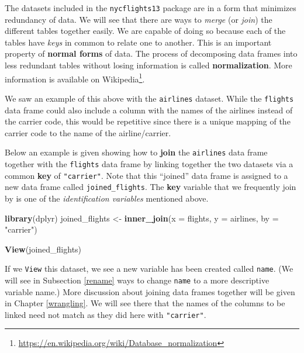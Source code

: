 \documentclass[12pt,]{krantz}
\makeatletter
\newenvironment{Shaded}{\begin{snugshade}}{\end{snugshade}}
\newcommand{\KeywordTok}[1]{\textcolor[rgb]{0.27,0.27,0.27}{\textbf{#1}}}
\newcommand{\DataTypeTok}[1]{\textcolor[rgb]{0.27,0.27,0.27}{#1}}
\newcommand{\StringTok}[1]{\textcolor[rgb]{0.5,0.5,0.5}{#1}}
\newcommand{\NormalTok}[1]{#1}
\renewcommand{\href}[2]{#2\footnote{\url{#1}}}
\newenvironment{kframe}{%
\medskip{}
\setlength{\fboxsep}{.8em}
 \def\at@end@of@kframe{}%
 \ifinner\ifhmode%
  \def\at@end@of@kframe{\end{minipage}}%
  \begin{minipage}{\columnwidth}%
 \fi\fi%
 \def\FrameCommand##1{\hskip\@totalleftmargin \hskip-\fboxsep
 \colorbox{shadecolor}{##1}\hskip-\fboxsep
     \hskip-\linewidth \hskip-\@totalleftmargin \hskip\columnwidth}%
 \MakeFramed {\advance\hsize-\width
   \@totalleftmargin\z@ \linewidth\hsize
   \@setminipage}}%
 {\par\unskip\endMakeFramed%
 \at@end@of@kframe}
\renewenvironment{Shaded}{\begin{kframe}}{\end{kframe}}
\makeatother
\begin{document}
The datasets included in the \texttt{nycflights13} package are in a form
that minimizes redundancy of data. We will see that there are ways to
\emph{merge} (or \emph{join}) the different tables together easily. We
are capable of doing so because each of the tables have \emph{keys} in
common to relate one to another. This is an important property of
\textbf{normal forms} of data. The process of decomposing data frames
into less redundant tables without losing information is called
\textbf{normalization}. More information is available on
\href{https://en.wikipedia.org/wiki/Database_normalization}{Wikipedia}.

We saw an example of this above with the \texttt{airlines} dataset.
While the \texttt{flights} data frame could also include a column with
the names of the airlines instead of the carrier code, this would be
repetitive since there is a unique mapping of the carrier code to the
name of the airline/carrier.

Below an example is given showing how to \textbf{join} the
\texttt{airlines} data frame together with the \texttt{flights} data
frame by linking together the two datasets via a common \textbf{key} of
\texttt{"carrier"}. Note that this ``joined'' data frame is assigned to
a new data frame called \texttt{joined\_flights}. The \textbf{key}
variable that we frequently join by is one of the \emph{identification
variables} mentioned above.

\begin{Shaded}
\begin{Highlighting}[]
\KeywordTok{library}\NormalTok{(dplyr)}
\NormalTok{joined_flights <-}\StringTok{ }\KeywordTok{inner_join}\NormalTok{(}\DataTypeTok{x =}\NormalTok{ flights, }
                             \DataTypeTok{y =}\NormalTok{ airlines, }
                             \DataTypeTok{by =} \StringTok{"carrier"}\NormalTok{)}
\end{Highlighting}
\end{Shaded}

\begin{Shaded}
\begin{Highlighting}[]
\KeywordTok{View}\NormalTok{(joined_flights)}
\end{Highlighting}
\end{Shaded}

If we \texttt{View} this dataset, we see a new variable has been created
called \texttt{name}. (We will see in Subsection \ref{rename} ways to
change \texttt{name} to a more descriptive variable name.) More
discussion about joining data frames together will be given in Chapter
\ref{wrangling}. We will see there that the names of the columns to be
linked need not match as they did here with \texttt{"carrier"}.
\end{document}
